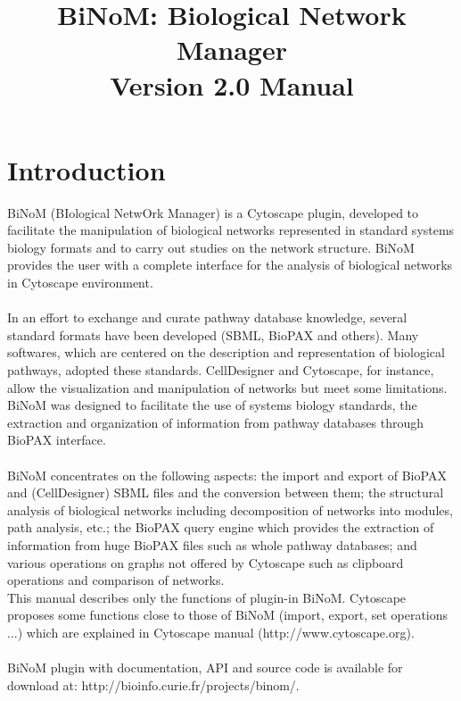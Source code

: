 \documentclass[11pt]{article}
\begin{document}
\title{\huge{BiNoM: Biological Network Manager \\ Version 2.0 Manual}}
\maketitle
\tableofcontents
\newpage
\section{Introduction}
BiNoM (BIological NetwOrk Manager) is a Cytoscape plugin, developed to facilitate the manipulation of biological networks represented in standard systems biology formats and to carry out studies on the network structure. BiNoM provides the user with a complete interface for the analysis of biological networks in Cytoscape environment.\\\\
In an effort to exchange and curate pathway database knowledge, several standard formats have been developed (SBML, BioPAX \cite{stromback2005representation} and others). Many softwares, which are centered on the description and representation of biological pathways, adopted these standards. CellDesigner\cite{kitano2005using} and Cytoscape\cite{shannon2003cytoscape}, for instance, allow the visualization and manipulation of networks but meet some limitations. BiNoM was designed to facilitate the use of systems biology standards, the extraction and organization of information from pathway databases through BioPAX interface.\\\\
BiNoM concentrates on the following aspects: the import and export of BioPAX and (CellDesigner) SBML files and the conversion between them; the structural analysis of biological networks including decomposition of networks into modules, path analysis, etc.; the BioPAX query engine which provides the extraction of information from huge BioPAX files such as whole pathway databases; and various operations on graphs not offered by Cytoscape such as clipboard operations and comparison of networks.\\
This manual describes only the functions of plugin-in BiNoM. Cytoscape proposes some functions close to those of BiNoM (import, export, set operations ...) which are explained in Cytoscape manual (http://www.cytoscape.org).
\\\\
BiNoM plugin with documentation, API and source code is available for download at: http://bioinfo.curie.fr/projects/binom/.\\\\
\end{document}
